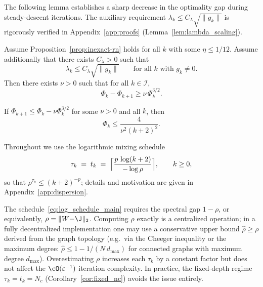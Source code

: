 \documentclass[review,onefignum,onetabnum]{siamart171218}
\begin{document}
The following lemma establishes a sharp decrease in the optimality gap
during steady-descent iterations.
The auxiliary requirement $\lambda_k\le C_\lambda\sqrt{\|g_k\|}$ is
rigorously verified in Appendix~\ref{app:proofs}
(Lemma~\ref{lem:lambda_scaling}).

\begin{lemma}\label{lem:steady}
Assume Proposition~\ref{prop:inexact-rn} holds for all $k$ with some $\eta\le 1/12$.
Assume additionally that there exists $C_\lambda>0$ such that
\[
\lambda_k\le C_\lambda\sqrt{\|g_k\|}\qquad\text{for all $k$ with $g_k\neq 0$}.
\]
Then there exists $\nu>0$ such that for all $k\in\mathcal I$,
\[
\Phi_k-\Phi_{k+1}\ge \nu\,\Phi_k^{3/2}.
\]
\end{lemma}

\begin{lemma}\label{lem:solve32}
If $\Phi_{k+1}\le \Phi_k-\nu\Phi_k^{3/2}$ for some $\nu>0$ and all $k$, then
\[
\Phi_k\le \frac{4}{\nu^2(k+2)^2}.
\]
\end{lemma}

Throughout we use the logarithmic mixing schedule
\begin{equation}\label{eq:log_schedule_main}
  \tau_k \;=\; t_k \;=\; \Bigl\lceil \frac{p\,\log(k+2)}{-\log\rho} \Bigr\rceil,
  \qquad k\ge 0,
\end{equation}
so that $\rho^{\tau_k}\le(k+2)^{-p}$; details and motivation are given in
Appendix~\ref{app:dispersion}.

\begin{remark}\label{rem:rho_knowledge}
The schedule~\eqref{eq:log_schedule_main} requires the spectral
gap $1{-}\rho$, or equivalently, $\rho=\|W{-}\J\|_2$.
Computing $\rho$ exactly is a centralized operation; in a fully
decentralized implementation one may use a conservative upper
bound $\hat\rho\ge\rho$ derived from the graph topology
(e.g.\ via the Cheeger inequality or the maximum degree:
$\hat\rho\le 1-1/(N\,d_{\max})$ for connected graphs with
maximum degree $d_{\max}$).
Overestimating $\rho$ increases each $\tau_k$ by a constant
factor but does not affect the $\cO(\varepsilon^{-1})$ iteration
complexity.
In practice, the fixed-depth regime $\tau_k{=}t_k{=}N_c$
(Corollary~\ref{cor:fixed_nc}) avoids the issue entirely.
\end{remark}
\end{document}

